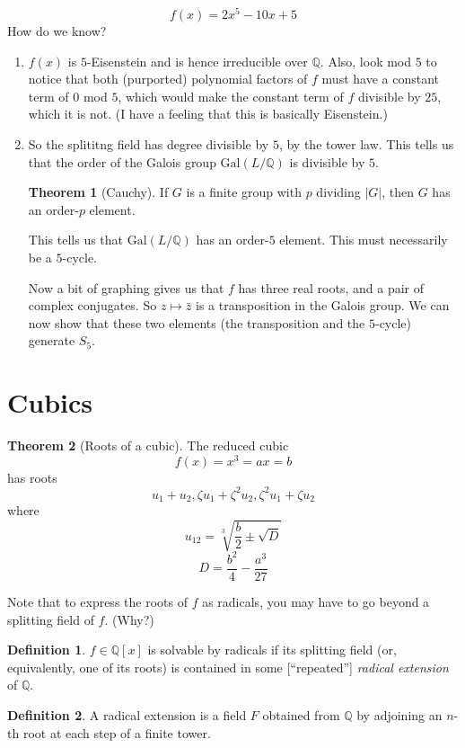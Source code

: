 \documentclass{article}
\newcommand{\Q}{\mathbb Q}
\newcommand{\gal}[2]{\text{Gal}(#1/#2)}
\theoremstyle{definition}
\newtheorem*{thm}{Theorem}
\newtheorem*{defn}{Definition}
\begin{document}
$$f(x) = 2x^5 - 10x + 5$$
How do we know?

\begin{enumerate}
\item $f(x)$ is $5$-Eisenstein and is hence irreducible over $\Q$. Also, look
  mod $5$ to notice that both (purported) polynomial factors of $f$ must have a
  constant term of $0$ mod $5$, which would make the constant term of $f$
  divisible by $25$, which it is not. (I have a feeling that this is basically
  Eisenstein.)
\item So the splititng field has degree divisible by $5$, by the tower law. This
  tells us that the order of the Galois group $\gal L \Q$ is divisible by $5$.

  \begin{thm}[Cauchy]
    If $G$ is a finite group with $p$ dividing $|G|$, then $G$ has an order-$p$
    element.
  \end{thm}

  This tells us that $\gal L \Q$ has an order-$5$ element. This must necessarily
  be a $5$-cycle.

  Now a bit of graphing gives us that $f$ has three real roots, and a pair of
  complex conjugates. So $z\mapsto\bar z$ is a transposition in the Galois
  group. We can now show that these two elements (the transposition and the
  $5$-cycle) generate $S_5$.
  
\end{enumerate}

\section{Cubics}

\begin{thm}[Roots of a cubic]
  The reduced cubic
  $$f(x) = x^3 = ax = b$$
  has roots
  $$u_1+u_2,\zeta u_1+\zeta^2 u_2, \zeta^2 u_1+\zeta u_2$$
  where
  $$u_{12} = \sqrt[3]{\frac b2 \pm \sqrt D}$$
  $$D = \frac {b^2}4 - \frac{a^3}{27}$$
\end{thm}

Note that to express the roots of $f$ as radicals, you may have to go beyond a
splitting field of $f$. (Why?)

\begin{defn}
 $f\in\Q[x]$ is solvable by radicals if its splitting field (or, equivalently,
 one of its roots) is contained in some [``repeated''] \textit{radical extension} of $\Q$. 
\end{defn}

\begin{defn}
  A radical extension is a field $F$ obtained from $\Q$ by adjoining an $n$-th
  root at each step of a finite tower.
\end{defn}
\end{document}
